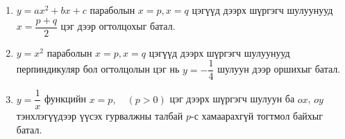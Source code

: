 \begin{enumerate}
\begin{enumerate}
  \item $x^m (a-x)^n \le 
    \dfrac{m^m n^n}{(m+n)^{m+n}}\, a^{m+n}$, хэрэв $m>0$, $n>0$, $0\le x\le a$.
  \item $\dfrac{x+a}{2^{(n-1)/n}} \le \sqrt[n]{x^n+a^n} \le x+a$, хэрэв $x>0,\, a>0,\, n>1$.
  \item $|a\sin x + b\cos x| \le \sqrt{a^2+b^2}$.
  \item $\dfrac{2}{3} \le \dfrac{x^2+1}{x^3+x+1} \le 2$, бүх $x \in \mathbb{R}$-д.
   \end{enumerate}
\item $y=ax^2+bx+c$ параболын $x=p, x=q$ цэгүүд дээрх шүргэгч шулуунууд $x=\dfrac{p+q}{2}$ цэг дээр огтолцохыг батал.
\item $y=x^2$ параболын $x=p, x=q$ цэгүүд дээрх шүргэгч шулуунууд перпиндикуляр бол огтолцолын цэг нь $y=-\dfrac{1}{4}$ шулуун дээр оршихыг батал.
\item $y=\dfrac{1}{x}$ функцийн $x=p ,\quad (p>0)$ цэг дээрх шүргэгч шулуун ба $ox$, $oy$ тэнхлэгүүдээр үүсэх гурвалжны талбай $p$-с хамаарахгүй тогтмол байхыг батал.
\end{enumerate}
\newpage
